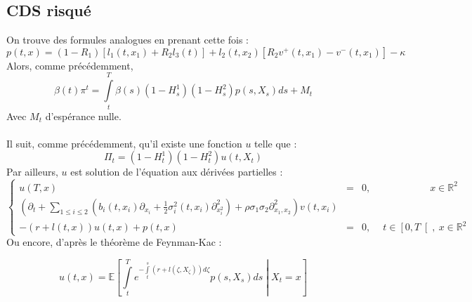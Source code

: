 \documentclass[a4paper]{article}
\theoremstyle{definition}
\theoremstyle{remark}
\begin{document}
\subsection{CDS risqué}
On trouve des formules analogues en prenant cette fois :
\begin{equation*}
p(t,x) = (1-R_1)\left[l_1(t,x_1) + R_2 l_3 (t) \right] + l_2 (t,x_2) \left[R_2 v^+ (t,x_1) - v^-(t,x_1)\right] - \kappa
\end{equation*}
Alors, comme précédemment,
\begin{equation*}
\beta(t)\pi^t = \int \limits_t^T \beta(s) (1-H_s^1) (1-H_s^2) p(s,X_s) ds + M_t
\end{equation*}
Avec $M_t$ d'espérance nulle.\\ \\
Il suit, comme précédemment, qu'il existe une fonction $u$ telle que :
\begin{equation*}
\Pi_t = (1 - H^1_t)(1-H^2_t)u(t,X_t)
\end{equation*}
Par ailleurs, $u$ est solution de l'équation aux dérivées partielles :
\begin{equation}
\left\{
\begin{split}
u(T, x) &=& 0,\qquad \qquad \qquad x \in \mathbb{R}^2 \\
\left(\partial_t +\sum \limits_{1 \leq i \leq 2} ( b_i(t,x_i)\partial_{x_i} + \frac{1}{2}\sigma_i^2(t,x_i)\partial^2_{x^2_i}) + \rho \sigma_1 \sigma_2 \partial^2_{x_1,x_2}\right)v(t,x_i) \\
- (r+l(t,x))u(t,x) + p(t,x) &=& 0,\quad \ t\in\left[0,T\right[,\ x \in \mathbb{R}^2
\end{split}
\right.
\end{equation}
Ou encore, d'après le théorème de Feynman-Kac :

\begin{equation}
u(t,x) = \mathbb{E}\left[\int \limits_t^T e^{-\int \limits_t^s (r + l(\zeta, X_\zeta))d\zeta} p (s, X_s) ds \middle| X_t = x \right]
\end{equation}
~~\\\\
\end{document}
